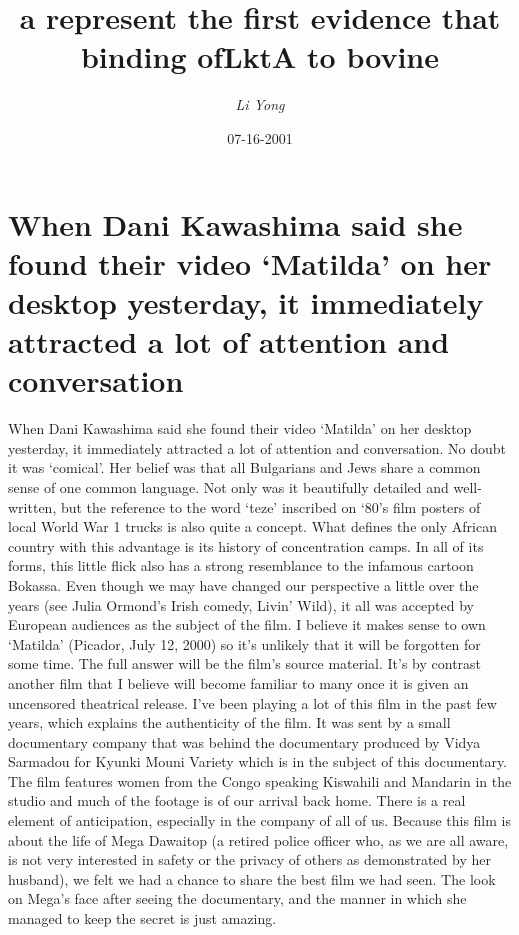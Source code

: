 \documentclass{article}%
\title{a represent the first evidence that binding ofLktA to bovine}%
\author{\textit{Li Yong}}%
\date{07-16-2001}%
\begin{document}
%
\normalsize%
\maketitle%
\section{When Dani Kawashima said she found their video ‘Matilda’ on her desktop yesterday, it immediately attracted a lot of attention and conversation}%
\label{sec:WhenDaniKawashimasaidshefoundtheirvideoMatildaonherdesktopyesterday,itimmediatelyattractedalotofattentionandconversation}%
When Dani Kawashima said she found their video ‘Matilda’ on her desktop yesterday, it immediately attracted a lot of attention and conversation. No doubt it was ‘comical’. Her belief was that all Bulgarians and Jews share a common sense of one common language.\newline%
Not only was it beautifully detailed and well{-}written, but the reference to the word ‘teze’ inscribed on ‘80’s film posters of local World War 1 trucks is also quite a concept. What defines the only African country with this advantage is its history of concentration camps. In all of its forms, this little flick also has a strong resemblance to the infamous cartoon Bokassa.\newline%
Even though we may have changed our perspective a little over the years (see Julia Ormond’s Irish comedy, Livin’ Wild), it all was accepted by European audiences as the subject of the film. I believe it makes sense to own ‘Matilda’ (Picador, July 12, 2000) so it’s unlikely that it will be forgotten for some time. The full answer will be the film’s source material.\newline%
It’s by contrast another film that I believe will become familiar to many once it is given an uncensored theatrical release. I’ve been playing a lot of this film in the past few years, which explains the authenticity of the film. It was sent by a small documentary company that was behind the documentary produced by Vidya Sarmadou for Kyunki Mouni Variety which is in the subject of this documentary. The film features women from the Congo speaking Kiswahili and Mandarin in the studio and much of the footage is of our arrival back home.\newline%
There is a real element of anticipation, especially in the company of all of us. Because this film is about the life of Mega Dawaitop (a retired police officer who, as we are all aware, is not very interested in safety or the privacy of others as demonstrated by her husband), we felt we had a chance to share the best film we had seen. The look on Mega’s face after seeing the documentary, and the manner in which she managed to keep the secret is just amazing.\newline%
\end{document}
